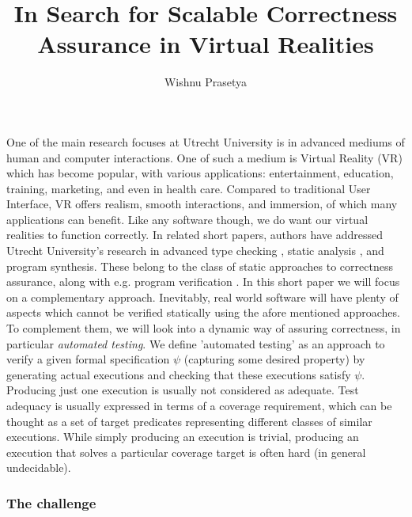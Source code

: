 \documentclass[sigplan]{acmart}\settopmatter{printfolios=false,printccs=false,printacmref=false}
\begin{document}
\title[Short Title]{In Search for Scalable Correctness Assurance in Virtual Realities}  
\author{Wishnu Prasetya}

\maketitle

One of the main research focuses at Utrecht University is in advanced mediums of human and computer
interactions. One of such a medium is Virtual Reality (VR) which has become popular, with various applications: entertainment, education,
training, marketing, and even in health care. 
%
%
Compared to traditional User Interface, VR offers realism, smooth interactions, and immersion, of which
many applications can benefit. Like any software though, we do want our virtual realities to
function correctly. In related short papers, authors have addressed Utrecht University's research in
%
advanced type checking \cite{wouterLorenz2018},
static analysis \cite{hageLorenz2018},
and program synthesis.
These belong to the class of static approaches to correctness assurance, along with
e.g. program verification \cite{cok2004esc}.
%
In this short paper we will focus on a complementary approach. 
Inevitably, real world software will have
plenty of aspects which cannot be verified statically using the afore mentioned approaches.
To complement them, we will look into a dynamic way of assuring correctness, in particular
{\em automated testing}. We define 'automated testing' as an
approach to verify a given formal specification $\psi$ (capturing some desired property) 
by generating actual executions and checking
that these executions satisfy $\psi$. Producing just one execution is usually not considered
as adequate. Test adequacy is usually expressed in terms of a coverage requirement, which can
be thought as a set of target predicates representing different classes of similar executions.
While simply producing an execution is trivial, producing an execution that solves a particular
coverage target is often hard (in general undecidable).


\subsubsection*{The challenge}
\end{document}
